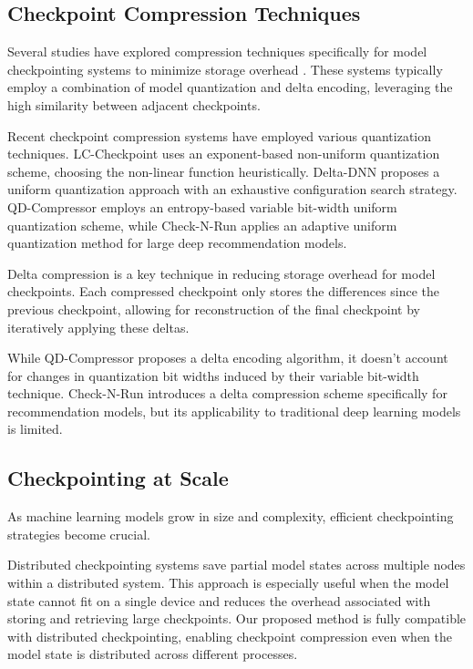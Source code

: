 \subsection{Checkpoint Compression Techniques}

Several studies have explored compression techniques specifically for model checkpointing systems to minimize storage overhead \cite{QD,lcCompression,checknrun,deltadnn}. These systems typically employ a combination of model quantization and delta encoding, leveraging the high similarity between adjacent checkpoints.

 Recent checkpoint compression systems have employed various quantization techniques. LC-Checkpoint \cite{lcCompression} uses an exponent-based non-uniform quantization scheme, choosing the non-linear function heuristically. Delta-DNN \cite{deltadnn} proposes a uniform quantization approach with an exhaustive configuration search strategy. QD-Compressor \cite{QD} employs an entropy-based variable bit-width uniform quantization scheme, while Check-N-Run \cite{checknrun} applies an adaptive uniform quantization method \cite{adaptive-uniform-quant} for large deep recommendation models.


 Delta compression is a key technique in reducing storage overhead for model checkpoints. Each compressed checkpoint only stores the differences since the previous checkpoint, allowing for reconstruction of the final checkpoint by iteratively applying these deltas.

While QD-Compressor \cite{QD} proposes a delta encoding algorithm, it doesn't account for changes in quantization bit widths induced by their variable bit-width technique. Check-N-Run \cite{checknrun} introduces a delta compression scheme specifically for recommendation models, but its applicability to traditional deep learning models is limited.

\subsection{Checkpointing at Scale} As machine learning models grow in size and complexity, efficient checkpointing strategies become crucial.

 Distributed checkpointing systems \cite{distChkpt-1, checknrun} save partial model states across multiple nodes within a distributed system. This approach is especially useful when the model state cannot fit on a single device and reduces the overhead associated with storing and retrieving large checkpoints. Our proposed method is fully compatible with distributed checkpointing, enabling checkpoint compression even when the model state is distributed across different processes.

